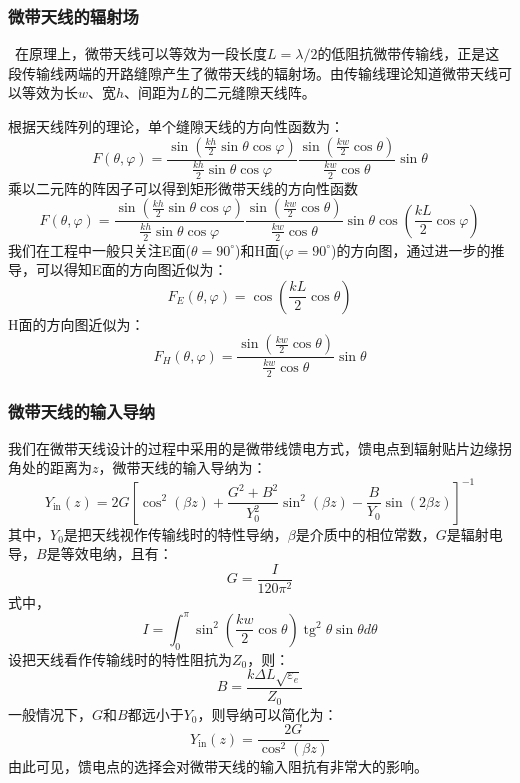 \documentclass{article}
\newcommand{\tmop}[1]{\ensuremath{\operatorname{#1}}}
\begin{document}
\subsubsection{微带天线的辐射场}

\ 在原理上，微带天线可以等效为一段长度$L = \lambda /
2$的低阻抗微带传输线，正是这段传输线两端的开路缝隙产生了微带天线的辐射场。由传输线理论知道微带天线可以等效为长$w$、宽$h$、间距为$L$的二元缝隙天线阵。

根据天线阵列的理论，单个缝隙天线的方向性函数为：
\[ F \left( \theta, \varphi \right) = \frac{\sin \left( \frac{k h}{2} \sin
   \theta \cos \varphi \right)}{\frac{k h}{2} \sin \theta \cos \varphi}
   \frac{\sin \left( \frac{k w}{2} \cos \theta \right)}{\frac{k w}{2} \cos
   \theta} \sin \theta \]
乘以二元阵的阵因子可以得到矩形微带天线的方向性函数
\[ F \left( \theta, \varphi \right) = \frac{\sin \left( \frac{k h}{2} \sin
   \theta \cos \varphi \right)}{\frac{k h}{2} \sin \theta \cos \varphi}
   \frac{\sin \left( \frac{k w}{2} \cos \theta \right)}{\frac{k w}{2} \cos
   \theta} \sin \theta \cos \left( \frac{k L}{2} \cos \varphi \right) \]
我们在工程中一般只关注E面($\theta = 90^{\circ}$)和H面($\varphi =
90^{\circ}$)的方向图，通过进一步的推导，可以得知E面的方向图近似为：
\[ F_E \left( \theta, \varphi \right) = \cos \left( \frac{k L}{2} \cos \theta
   \right) \]
H面的方向图近似为：
\[ F_H \left( \theta, \varphi \right) = \frac{\sin \left( \frac{k w}{2} \cos
   \theta \right)}{\frac{k w}{2} \cos \theta} \sin \theta \]

\subsubsection{微带天线的输入导纳}

我们在微带天线设计的过程中采用的是微带线馈电方式，馈电点到辐射贴片边缘拐角处的距离为$z$，微带天线的输入导纳为：
\[ Y_{\tmop{in}} \left( z \right) = 2 G \left[ \cos^2 \left( \beta z \right) +
   \frac{G^2 + B^2}{Y_0^2} \sin^2 \left( \beta z \right) - \frac{B}{Y_0} \sin
   \left( 2 \beta z \right) \right]^{- 1} \]
其中，$Y_0$是把天线视作传输线时的特性导纳，$\beta$是介质中的相位常数，$G$是辐射电导，$B$是等效电纳，且有：
\[ G = \frac{I}{120 \pi^2} \]
式中，
\[ I = \int_0^{\pi} \sin^2 \left( \frac{k w}{2} \cos \theta \right)
   \tmop{tg}^2 \theta \sin \theta d \theta \]
设把天线看作传输线时的特性阻抗为$Z_0$，则：
\[ B = \frac{k \Delta L \sqrt{\varepsilon_e}}{Z_0} \]
一般情况下，$G$和$B$都远小于$Y_0$，则导纳可以简化为：
\begin{equation}
  \label{eq:daona} Y_{\tmop{in}} \left( z \right) = \frac{2 G}{\cos^2 \left(
  \beta z \right)}
\end{equation}
由此可见，馈电点的选择会对微带天线的输入阻抗有非常大的影响。
\end{document}
